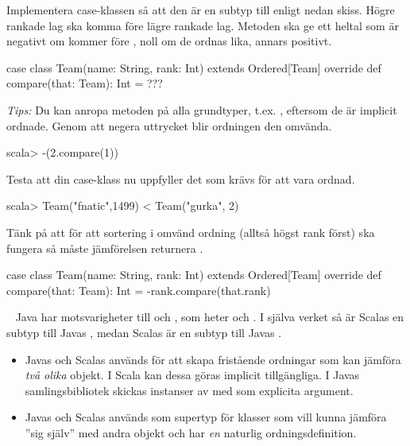 \Subtask Implementera case-klassen  så att den är en subtyp till  enligt nedan skiss. Högre rankade lag ska komma före lägre rankade lag. Metoden  ska ge ett heltal som är negativt om  kommer före , noll om de ordnas lika, annars positivt.

\begin{Code}
case class Team(name: String, rank: Int) extends Ordered[Team]{
  override def compare(that: Team): Int = ???
}
\end{Code}
\emph{Tips:} Du kan anropa metoden  på alla grundtyper, t.ex. , eftersom de är implicit ordnade. Genom att negera uttrycket blir ordningen den omvända.
\begin{REPL}
scala> -(2.compare(1))
\end{REPL}

\Subtask Testa att  din case-klass nu uppfyller det som krävs för att vara ordnad.
\begin{REPL}
scala> Team("fnatic",1499) < Team("gurka", 2)
\end{REPL}


\SOLUTION


\TaskSolved \what


Tänk på att för att sortering i omvänd ordning (alltså högst rank först) ska fungera så måste jämförelsen returnera .

\begin{CodeSmall}
case class  Team(name: String, rank: Int) extends Ordered[Team]{
  override def compare(that: Team): Int = -rank.compare(that.rank)
}
\end{CodeSmall}



\QUESTEND






\QUESTBEGIN

\Task  \what~
Java har motsvarigheter till  och , som heter  och . I själva verket så är Scalas  en subtyp till Javas , medan Scalas  är en subtyp till Javas .
\begin{itemize}[nolistsep, noitemsep]
\item Javas  och Scalas  används för att skapa fristående ordningar som kan jämföra \emph{två olika} objekt. I Scala kan dessa göras implicit tillgängliga. I Javas samlingsbibliotek skickas instanser av  med som explicita argument.
\item Javas  och Scalas  används som supertyp för klasser som vill kunna jämföra ''sig själv'' med andra objekt och har \emph{en} naturlig ordningsdefinition.
\end{itemize}

